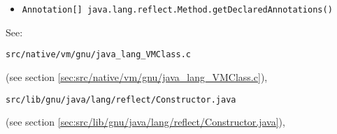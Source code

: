 \documentclass[a4paper, 10pt, titlepage]{scrartcl} %
\begin{document}
\begin{itemize}
 \item \begin{scriptsize}\verb|Annotation|\hspace{0.0pt}\verb|[|\hspace{0.0pt}\verb||\hspace{0.0pt}\verb|]|\hspace{0.0pt}\verb||\hspace{0.0pt}\verb| |\hspace{0.0pt}\verb|java|\hspace{0.0pt}\verb|.|\hspace{0.0pt}\verb|lang|\hspace{0.0pt}\verb|.|\hspace{0.0pt}\verb|reflect|\hspace{0.0pt}\verb|.|\hspace{0.0pt}\verb|Method|\hspace{0.0pt}\verb|.|\hspace{0.0pt}\verb|getDeclaredAnnotations|\hspace{0.0pt}\verb|(|\hspace{0.0pt}\verb||\hspace{0.0pt}\verb|)|\hspace{0.0pt}\verb||\end{scriptsize}
\end{itemize}
See: \begin{scriptsize}\verb|src|\hspace{0.0pt}\verb|/|\hspace{0.0pt}\verb|native|\hspace{0.0pt}\verb|/|\hspace{0.0pt}\verb|vm|\hspace{0.0pt}\verb|/|\hspace{0.0pt}\verb|gnu|\hspace{0.0pt}\verb|/|\hspace{0.0pt}\verb|java_lang_VMClass|\hspace{0.0pt}\verb|.|\hspace{0.0pt}\verb|c|\end{scriptsize} (see section \ref{sec:src/native/vm/gnu/java_lang_VMClass.c}),
\begin{scriptsize}\verb|src|\hspace{0.0pt}\verb|/|\hspace{0.0pt}\verb|lib|\hspace{0.0pt}\verb|/|\hspace{0.0pt}\verb|gnu|\hspace{0.0pt}\verb|/|\hspace{0.0pt}\verb|java|\hspace{0.0pt}\verb|/|\hspace{0.0pt}\verb|lang|\hspace{0.0pt}\verb|/|\hspace{0.0pt}\verb|reflect|\hspace{0.0pt}\verb|/|\hspace{0.0pt}\verb|Constructor|\hspace{0.0pt}\verb|.|\hspace{0.0pt}\verb|java|\end{scriptsize} (see section \ref{sec:src/lib/gnu/java/lang/reflect/Constructor.java}),
\end{document}
